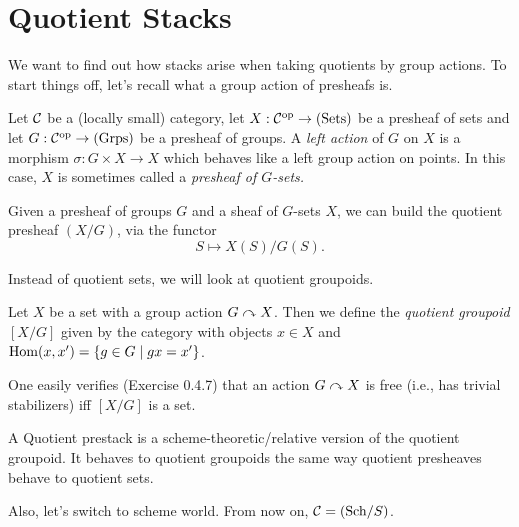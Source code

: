 \documentclass[a4paper,11pt]{article}
\begin{document}
\section{Quotient Stacks} 
We want to find out how stacks arise when taking quotients by group actions.
To start things off, let's recall what a group action of presheafs is. 
\begin{defi}
    Let $\mathcal{C}$ be a (locally small) category, let $X: \mathcal{C}^{\mathrm{op}} \to (\mathrm{Sets})$ be a 
    presheaf of sets and let $G: \mathcal{C}^{\mathrm{op}} \to \textnormal{(Grps)}$ be a presheaf of groups. 
    A \textit{left action} of $G$ on $X$ is a morphism $\sigma: G \times X \to X$
    which behaves like a left group action on points. In this case, $X$ is sometimes
    called a \textit{presheaf of $G$-sets.}
\end{defi}

\begin{defi}
    Given a presheaf of groups $G$ and a sheaf of $G$-sets $X$, we can build the
    quotient presheaf $(X/G)$, via the functor
    \begin{equation*}
        S \mapsto X(S)/G(S).
    \end{equation*}
\end{defi}

Instead of quotient sets, we will look at quotient groupoids.
\begin{defi}
    Let $X$ be a set with a group action $G \curvearrowright X$. Then we define
    the \textit{quotient groupoid} $[X/G]$ given by the category with
    objects $x \in X$ and $\operatorname{Hom}(x,x') = \{g \in G \mid gx = x'\}$. 
\end{defi}
One easily verifies (Exercise 0.4.7) that an action $G \curvearrowright X$ is free (i.e.,
has trivial stabilizers) iff $[X/G]$ is a set.

A Quotient prestack is a scheme-theoretic/relative version of the quotient groupoid.
It behaves to quotient groupoids the same way quotient presheaves behave to 
quotient sets.

Also, let's switch to scheme world. From now on, $\mathcal{C} = (\mathrm{Sch}/ S)$. 
\end{document}

